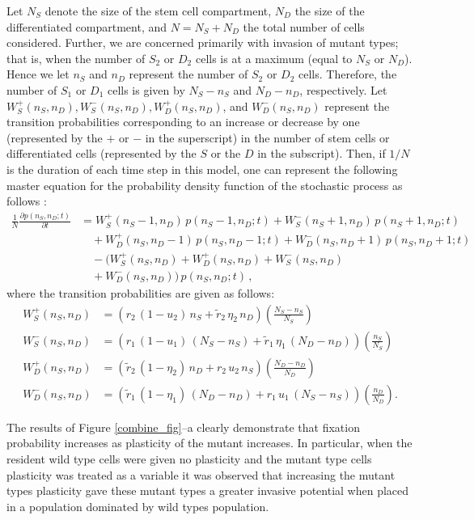 \documentclass[12pt]{article}
\begin{document}
Let $N_S$ denote the size of the stem cell compartment, $N_D$ the size of the differentiated compartment, and $N=N_S+N_D$ the total number of cells considered. Further, we are concerned primarily with invasion of mutant types; that is, when the number of $S_2$ or $D_2$ cells is at a maximum (equal to $N_S$ or $N_D$). Hence we let $n_S$ and $n_D$ represent the number of $S_2$ or $D_2$ cells. Therefore, the number of $S_1$ or $D_1$ cells is given by $N_S-n_S$ and $N_D-n_D$, respectively. Let $W_S^+(n_S,n_D), W_S^-(n_S,n_D), W_D^+(n_S,n_D)$, and $W_D^-(n_S,n_D)$ represent the transition probabilities corresponding to an increase or decrease by one (represented by the $+$ or $-$ in the superscript) in the number of stem cells or differentiated cells (represented by the $S$ or the $D$ in the subscript). Then, if $1/N$ is the duration of each time step in this model, one can represent the following master equation for the probability density function of the stochastic process as follows \cite{mohammad}:
\begin{align}
\frac{1}{N}\frac{\partial p(n_S,n_D;t)}{\partial t}&=W_S^+(n_S-1,n_D)\, p(n_S-1,n_D;t) + W_S^-(n_S+1,n_D)\, p(n_S+1,n_D;t)\nonumber\\
&\quad
+ W_D^+(n_S,n_D-1)\, p(n_S,n_D-1;t) + W_D^-(n_S,n_D+1)\, p(n_S,n_D+1;t)\nonumber\\
&\quad
-(W_S^+(n_S,n_D)+W_D^+(n_S,n_D)+W_S^-(n_S,n_D) \nonumber\\
&\quad
+W_D^-(n_S,n_D))\, p(n_S,n_D;t)  \, ,
\label{MohRef1}
\end{align}
where the transition probabilities are given as follows:
\begin{align}
W_S^+(n_S,n_D) &= \left(r_2\,(1-u_2)\,n_S+\tilde{r}_2\,\eta_2\,n_D\right)\left(\frac{N_S-n_S}{N_S}\right)\label{MohRef2}\\
W_S^-(n_S,n_D) &= \left(r_1\,(1-u_1)\,(N_S-n_S)+\tilde{r}_1\,\eta_1\,(N_D-n_D)\right)\left(\frac{n_S}{N_S}\right)\\
W_D^+(n_S,n_D) &= \left(\tilde{r}_2\,(1-\eta_2)\,n_D+r_2\,u_2\,n_S\right)\left(\frac{N_D-n_D}{N_D}\right)\\
W_D^-(n_S,n_D) &= \left(\tilde{r}_1\,(1-\eta_1)\,(N_D-n_D)+r_1\,u_1\,(N_S-n_S)\right)\left(\frac{n_D}{N_D}\right).
\label{MohRef3}
\end{align}

The results of Figure \ref{combine_fig}--a clearly demonstrate that fixation probability increases as plasticity of the mutant increases. In particular, when the resident wild type cells were given no plasticity and the mutant type cells plasticity was treated as a variable it was observed that increasing the mutant types plasticity gave these mutant types a greater invasive potential when placed in a population dominated by wild types population.
\end{document}
